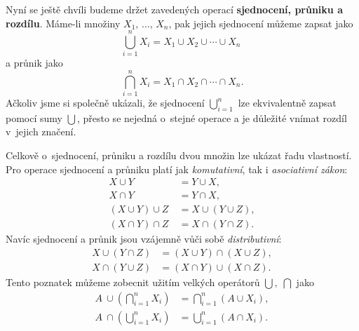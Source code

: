 Nyní se ještě chvíli budeme držet zavedených operací \textbf{sjednocení, průniku a rozdílu}. Máme-li množiny $X_1,\,\dots,\,X_n$, pak jejich sjednocení můžeme zapsat jako
\begin{equation*}
    \bigcup\limits_{i=1}^{n}{X_i}=X_1 \cup X_2 \cup \cdots \cup X_n\;
\end{equation*}
a průnik jako
\begin{equation*}
    \bigcap\limits_{i=1}^{n}{X_i}=X_1 \cap X_2 \cap \cdots \cap X_n.
\end{equation*}
Ačkoliv jsme si společně ukázali, že sjednocení $\bigcup_{i=1}^{n}$ lze ekvivalentně zapsat pomocí sumy $\bigcup$, přesto se nejedná o~stejné operace a je důležité vnímat rozdíl v~jejich značení.\par
Celkově o~sjednocení, průniku a rozdílu dvou množin lze ukázat řadu vlastností. Pro operace sjednocení a průniku platí jak \emph{komutativní}, tak i \emph{asociativní zákon}:
\begin{align*}
    X \cup Y&=Y \cup X,\\
    X \cap Y&=Y \cap X,\\
    (X \cup Y) \cup Z~&= X \cup (Y \cup Z),\\
    (X \cap Y) \cap Z~&= X \cap (Y \cap Z).
\end{align*}
Navíc sjednocení a průnik jsou vzájemně vůči sobě \emph{distributivní}:
\begin{align*}
    X \cup (Y \cap Z) &= (X \cup Y) \cap (X \cup Z),\\
    X \cap (Y \cup Z) &= (X \cap Y) \cup (X \cap Z).
\end{align*}
Tento poznatek můžeme zobecnit užitím velkých operátorů $\bigcup,\;\bigcap$ jako
\begin{align*}
    A~\cup \left(\bigcap\limits_{i=1}^{n}{X_i}\right)&=\bigcap\limits_{i=1}^{n}{(A \cup X_i)},\\
    A~\cap \left(\bigcup\limits_{i=1}^{n}{X_i}\right)&=\bigcup\limits_{i=1}^{n}{(A \cap X_i)}.
\end{align*}